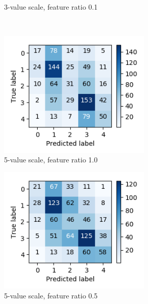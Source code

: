 \documentclass[11pt,a4paper]{article}
\begin{document}
\begin{figure}[ht]
\begin{subfigure}[t]{0.3\textwidth}
        \caption{3-value scale, feature ratio 0.1}
    \end{subfigure}\label{fig:cm301} \\
    \begin{subfigure}[t]{0.3\textwidth}
        \includegraphics[width=0.8\textwidth]{images/cm5_1.0.png}
        \caption{5-value scale, feature ratio 1.0}
    \end{subfigure}\label{fig:cm510}
    \begin{subfigure}[t]{0.3\textwidth}
        \includegraphics[width=0.8\textwidth]{images/cm5_0.5.png}
        \caption{5-value scale, feature ratio 0.5}
    \end{subfigure}\label{fig:cm505}
    \begin{subfigure}[t]{0.3\textwidth}

\end{subfigure}
\end{figure}
\end{document}
